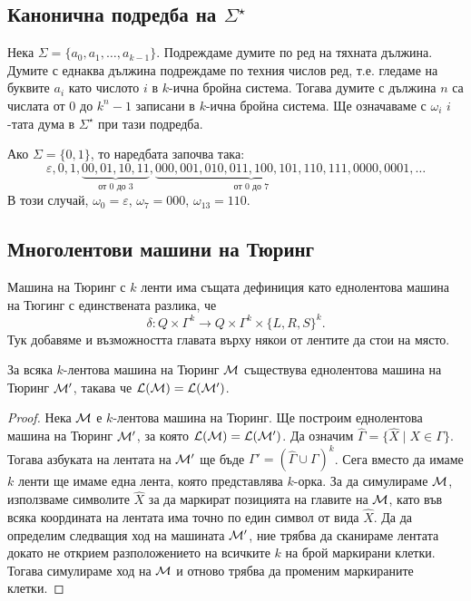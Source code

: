 \subsection*{Канонична подредба на $\Sigma^\star$}

Нека $\Sigma = \{a_0,a_1,\dots,a_{k-1}\}$.
Подреждаме думите по ред на тяхната дължина.
Думите с еднаква дължина подреждаме по техния числов ред, т.е.
гледаме на буквите $a_i$ като числото $i$ в $k$-ична бройна система.
Тогава думите с дължина $n$ са числата от $0$ до $k^n-1$ записани в $k$-ична бройна система.
Ще означаваме с $\omega_i$ $i$-тата дума в $\Sigma^\star$ при тази подредба.

\begin{example}
  Ако $\Sigma = \{0,1\}$, то наредбата започва така:
  \[\varepsilon, 0, 1, \underbrace{00, 01, 10, 11}_{\text{от $0$ до $3$}}, \underbrace{000, 001, 010, 011, 100, 101, 110, 111}_{\text{от $0$ до $7$}}, 0000, 0001, \dots\]
  В този случай, $\omega_0 = \varepsilon$, $\omega_7 = 000$, $\omega_{13} = 110$.
\end{example}

\subsection*{Многолентови машини на Тюринг}


Машина на Тюринг с $k$ ленти има същата дефиниция като еднолентова машина на Тюгинг
с единствената разлика, че
\[\delta: Q \times \Gamma^k\to Q \times \Gamma^k \times \{L,R,S\}^k.\]
Тук добавяме и възможността главата върху някои от лентите да стои на място.
\begin{prop}
  За всяка $k$-лентова машина на Тюринг $\mathcal{M}$ съществува еднолентова машина на Тюринг $\mathcal{M}'$,
  такава че $\mathcal{L}(\mathcal{M}) = \mathcal{L}(\mathcal{M}')$.
\end{prop}
\begin{proof}
  Нека $\mathcal{M}$ е $k$-лентова машина на Тюринг.
  Ще построим еднолентова машина на Тюринг $\mathcal{M}'$, за която $\mathcal{L}(\mathcal{M}) = \mathcal{L}(\mathcal{M}')$.
  Да означим $\hat\Gamma = \{\hat X \mid X \in \Gamma\}$.
  Тогава азбуката на лентата на $\mathcal{M}'$ ще бъде $\Gamma' = (\hat\Gamma \cup \Gamma)^{k}$.
  Сега вместо да имаме $k$ ленти ще имаме една лента, която представлява $k$-орка.
  За да симулираме $\mathcal{M}$, използваме символите $\hat X$ за да маркират позицията на главите на $\mathcal{M}$,
  като във всяка координата на лентата има точно по един символ от вида $\hat X$.
  Да да определим следващия ход на машината $\mathcal{M}'$, ние трябва да сканираме лентата докато не 
  открием разположението на всичките $k$ на брой маркирани клетки. Тогава симулираме ход на $\mathcal{M}$
  и отново трябва да променим маркираните клетки.
\end{proof}

